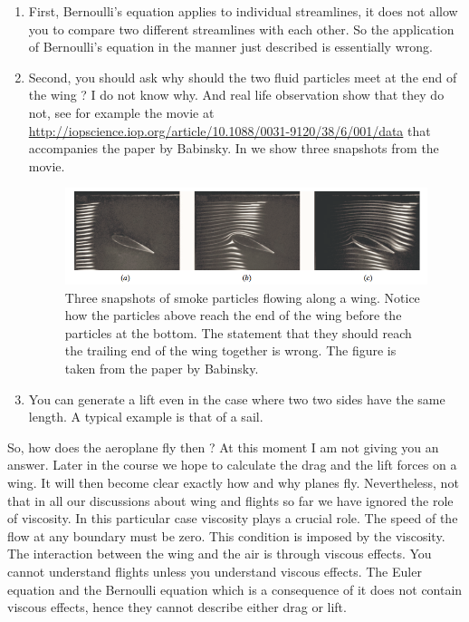 \begin{enumerate}
\item First, Bernoulli's equation applies to individual streamlines, it does not
allow you to compare two different streamlines with each other. So the application
of Bernoulli's equation in the manner just described is essentially wrong. 
\item Second, you should ask why should the two fluid particles meet at the end of the
wing ? I do not know why. And real life observation show that they do not,
see for example the movie at 
\url{http://iopscience.iop.org/article/10.1088/0031-9120/38/6/001/data}
that accompanies the paper by Babinsky. In  we show three snapshots
from the movie.
\begin{figure}
\includegraphics{figures/WingSpeedUpAndBottom.png}
\caption{Three snapshots of smoke particles flowing along 
a wing. Notice how the particles above reach the end of the wing
before the particles at the bottom. The statement that they should
reach the trailing end of the wing together is wrong. The figure is
taken from the paper by Babinsky.}
\label{fig:WingTopAndBottom}
\end{figure} 
\item You can generate a lift even in the case where two two sides have the same length. 
A typical example is that of a sail.
\end{enumerate}
So, how does the aeroplane fly then ? At this moment I am not giving you an answer. 
Later in the course we hope to calculate the drag and the lift forces on a wing. 
It will then become clear exactly how and why planes fly. 
Nevertheless, not that in all our discussions about wing and flights so far we have ignored the role of viscosity. 
In this particular case viscosity plays a crucial role. The speed of the flow at any boundary
must be zero. This condition is imposed by the viscosity. The interaction between the
wing and the air is through viscous effects. You cannot understand flights unless you
understand viscous effects. The Euler equation and the Bernoulli equation which is a 
consequence of it does not contain viscous effects, hence they cannot describe either drag or lift. 
